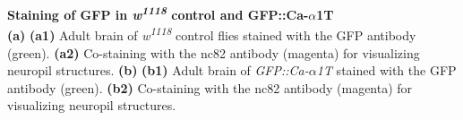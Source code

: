 \label{fig:S1} 
\textbf{Staining of GFP in \emph{w\textsuperscript{1118}} control and GFP::Ca-$\alpha$1T}
\\ 
\textbf{(a)} \textbf{(a1)} Adult brain of \emph{w\textsuperscript{1118}} control flies stained with the GFP antibody (green).
\textbf{(a2)} Co-staining with the nc82 antibody (magenta) for visualizing neuropil structures.
\textbf{(b)} \textbf{(b1)} Adult brain of \emph{GFP::Ca-$\alpha$1T} stained with the GFP antibody (green).
\textbf{(b2)} Co-staining with the nc82 antibody (magenta) for visualizing neuropil structures.